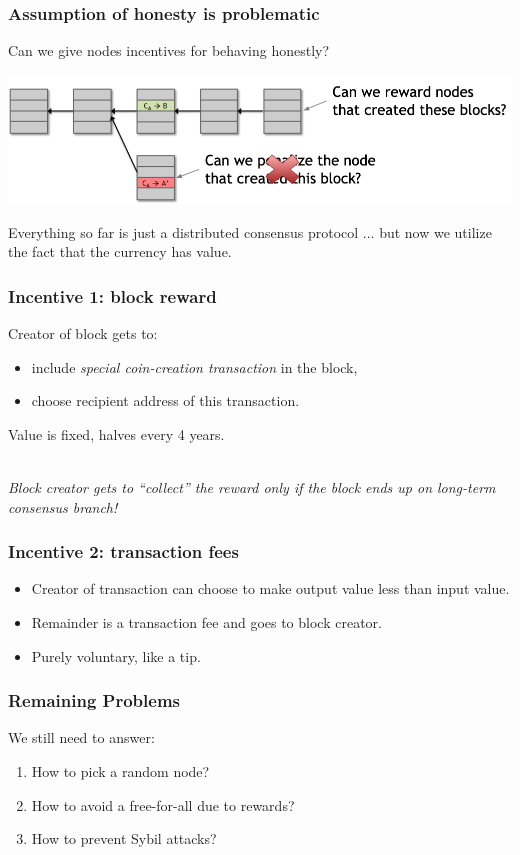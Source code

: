 \documentclass{beamer}
\begin{document}
\begin{frame}
  \frametitle{Assumption of honesty is problematic}
Can we give nodes incentives for behaving honestly?

	\includegraphics[scale=0.7]{incentives}
	
	\pause
	
Everything so far is just a distributed consensus protocol ... \pause
but now we utilize the fact that the currency has value.

\end{frame}
\begin{frame}
  \frametitle{Incentive 1: block reward}
	Creator of block gets to: 
	\begin{itemize}
		\item include \emph{special coin-creation transaction} in the block,
		\item choose recipient address of this transaction.
	\end{itemize}
	\pause
	Value is fixed, halves every 4 years. \\ $ $ \\
	\pause
	
	\emph{Block creator gets to ``collect'' the reward only if the block ends up on long-term consensus branch!}
\end{frame}
\begin{frame}
  \frametitle{Incentive 2: transaction fees}
	\begin{itemize}
		\item Creator of transaction can choose to make 
output value less than input value. \pause
		\item Remainder is a transaction fee and goes to block creator. \pause
		\item Purely voluntary, like a tip.
	\end{itemize}
\end{frame}
\begin{frame}
  \frametitle{Remaining Problems}
  We still need to answer:
	\begin{enumerate}
		\item How to pick a random node?

		\item How to avoid a free-for-all due to rewards?

		\item How to prevent Sybil attacks?
	\end{enumerate}
\end{frame}
\end{document}
